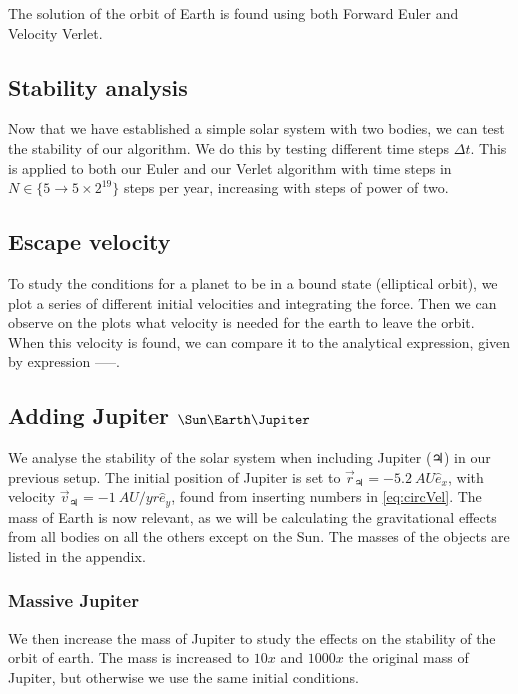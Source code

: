 \documentclass[10pt]{article}
\begin{document}
\begin{multicols}{2}
The solution of the orbit of Earth is found using both Forward Euler and
Velocity Verlet. 

\subsection{Stability analysis}
Now that we have established a simple solar system with two bodies, we can
test the stability of our algorithm. We do this by testing different time
steps $\Delta t$. This is applied to both our Euler and our Verlet
algorithm with time steps in $N \in \{5 \to 5 \times 2^{19}\}$ steps per year,
increasing with steps of power of two.

\subsection{Escape velocity}
To study the conditions for a planet to be in a bound state (elliptical orbit), we plot a series of different initial velocities and integrating the force. Then we can observe on the plots what velocity is needed for the earth to leave the orbit. When this velocity is found, we can compare it to the analytical expression, given by expression -----. 

\subsection{Adding Jupiter \texorpdfstring{$\Sun\Earth\Jupiter$}{}}
We analyse the stability of the solar system when including Jupiter
($\Jupiter$) in our previous setup. The initial position of Jupiter is set to
$\vec r_\Jupiter = -\SI{5.2}{AU}\hat e_x$, with velocity $\vec v_\Jupiter =
-\SI{1}{AU/yr}\hat e_y$, found from inserting numbers in \cref{eq:circVel}.
The mass of Earth is now relevant, as we will be calculating the
gravitational effects from all bodies on all the others except on the Sun.
The masses of the objects are listed in the appendix.

\subsubsection{Massive Jupiter }
We then increase the mass of Jupiter to study the effects on the stability
of the orbit of earth. The mass is increased to $10x$ and $1000x$ the
original mass of Jupiter, but otherwise we use the same initial conditions.


\end{multicols}
\end{document}
